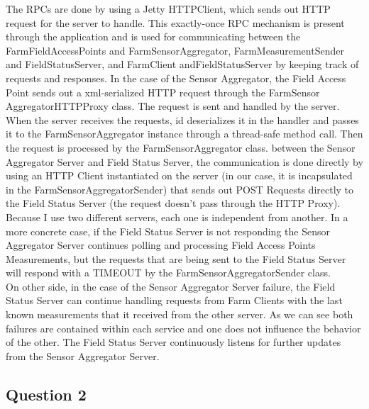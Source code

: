 \documentclass{article}      %
\begin{document}
The RPCs are done by using a Jetty HTTPClient, which sends out HTTP request for the server to handle. This exactly-once RPC mechanism is present through the application and is used for communicating between the FarmFieldAccessPoints and FarmSensorAggregator, FarmMeasurementSender and FieldStatusServer, and FarmClient andFieldStatusServer by keeping track of requests and responses. In the case of the Sensor Aggregator, the Field Access Point sends out a xml-serialized HTTP request through the FarmSensor AggregatorHTTPProxy class. The request is sent and handled by the server. When the server receives the requests, id deserializes it in the handler and passes it to the FarmSensorAggregator instance through a thread-safe method call. Then the request is processed by the FarmSensorAggregator class. between the Sensor Aggregator Server and Field Status Server, the communication is done directly by using an HTTP Client instantiated on the server (in our case, it is incapsulated in the FarmSensorAggregatorSender) that sends out POST Requests directly to the Field Status Server (the request doesn't pass through the HTTP Proxy).\\

Because I use two different servers, each one is independent from another. In a more concrete case, if the Field Status Server is not responding the Sensor Aggregator Server continues polling and processing Field Access Points Measurements, but the requests that are being sent to the Field Status Server will respond with a TIMEOUT by the FarmSensorAggregatorSender class.\\

On other side, in the case of the Sensor Aggregator Server failure, the Field Status Server can continue handling requests from Farm Clients with the last known measurements that it received from the other server. As we can see both failures are contained within each service and one does not influence the behavior of the other. The Field Status Server continuously listens for further updates from the Sensor Aggregator Server.\\

\subsection* {Question 2}
\end{document}

